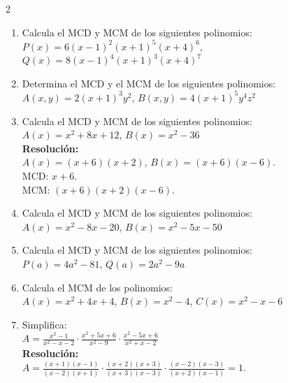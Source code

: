 \documentclass[10pt]{article}
\begin{document}
\begin{multicols}{2}
\begin{enumerate}[label=\textbf{\arabic*.}, itemsep=0.4cm]
			\item Calcula el MCD y MCM de los siguientes polinomios: \\
			$P(x) = 6 (x - 1)^2 (x + 1)^5 (x + 4)^6$, $Q(x) = 8 (x - 1)^4 (x + 1)^3 (x + 4)^7$ \\


			\item Determina el MCD y el MCM de los siguientes polinomios: \\
			$A(x, y) = 2 (x + 1)^3 y^2$, $B(x, y) = 4 (x + 1)^5 y^4 z^2$ \\


			\item Calcula el MCD y MCM de los siguientes polinomios: \\
			$A(x) = x^2 + 8x + 12$, $B(x) = x^2 - 36$ \\
			\textbf{Resolución:} \\
			$A(x) = (x + 6)(x + 2)$, $B(x) = (x + 6)(x - 6)$. \\
			MCD: $x + 6$. \\
			MCM: $(x + 6)(x + 2)(x - 6)$.

			\item Calcula el MCD y MCM de los siguientes polinomios: \\
			$A(x) = x^2 - 8x - 20$, $B(x) = x^2 - 5x - 50$ \\


			\item Calcula el MCD y MCM de los siguientes polinomios: \\
			$P(a) = 4a^2 - 81$, $Q(a) = 2a^2 - 9a$ \\


			\item Calcula el MCM de los polinomios: \\
			$A(x) = x^2 + 4x + 4$, $B(x) = x^2 - 4$, $C(x) = x^2 - x - 6$ \\


			\item Simplifica: \\
			$A = \frac{x^2 - 1}{x^2 - x - 2} \cdot \frac{x^2 + 5x + 6}{x^2 - 9} \cdot \frac{x^2 - 5x + 6}{x^2 + x - 2}$ \\
			\textbf{Resolución:} \\
			$A = \frac{(x + 1)(x - 1)}{(x - 2)(x + 1)} \cdot \frac{(x + 2)(x + 3)}{(x + 3)(x - 3)} \cdot \frac{(x - 2)(x - 3)}{(x + 2)(x - 1)} = 1$.


\end{enumerate}
\end{multicols}
\end{document}
